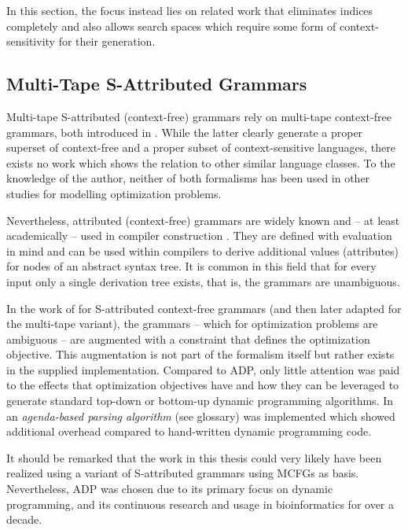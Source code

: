 \documentclass[
    a4paper,
    12pt,
    twoside,
    BCOR=12mm,
    parskip=half,
    chapterprefix,
    numbers=noenddot,
    bibliography=totoc
]{scrbook}
\begin{document}
In this section, the focus instead lies on related work that eliminates indices completely and also allows search spaces which require some form of context-sensitivity for their generation.

\subsection*{Multi-Tape S-Attributed Grammars}

Multi-tape S-attributed (context-free) grammars rely on multi-tape context-free grammars, both introduced in \citet{lefebvre_grammar-based_1996}. While the latter clearly generate a proper superset of context-free and a proper subset of context-sensitive languages, there exists no work which shows the relation to other similar language classes. To the knowledge of the author, neither of both formalisms has been used in other studies for modelling optimization problems.

Nevertheless, attributed (context-free) grammars are widely known and -- at least academically --  used in compiler construction \citep{dijkstra_architecture_2009}. They are defined with evaluation in mind and can be used within compilers to derive additional values (attributes) for nodes of an abstract syntax tree. It is common in this field that for every input only a single derivation tree exists, that is, the grammars are unambiguous.

In the work of \citet{lefebvre_optimized_1995} for S-attributed context-free grammars (and then later adapted for the multi-tape variant), the grammars -- which for optimization problems are ambiguous -- are augmented with a constraint that defines the optimization objective. This augmentation is not part of the formalism itself but rather exists in the supplied implementation. Compared to \gls{ADP}, only little attention was paid to the effects that optimization objectives have and how they can be leveraged to generate standard top-down or bottom-up dynamic programming algorithms. In \citet{lefebvre_optimized_1995,lefebvre_grammar-based_1996} an \emph{agenda-based parsing algorithm} (see glossary) was implemented which showed additional overhead compared to hand-written dynamic programming code.

It should be remarked that the work in this thesis could very likely have been realized using a variant of S-attributed grammars using \glspl{MCFG} as basis. Nevertheless, \gls{ADP} was chosen due to its primary focus on dynamic programming, and its continuous research and usage in bioinformatics for over a decade.
\end{document}
